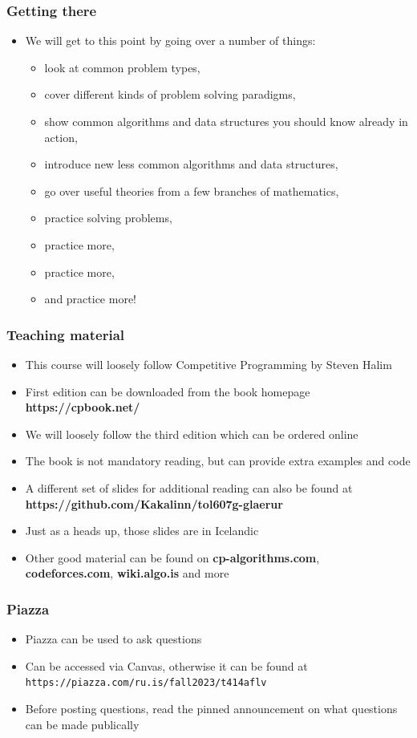 \documentclass{beamer}
\begin{document}
\begin{frame}[plain]
	\frametitle{Getting there}
	\begin{itemize}
		 \item We will get to this point by going over a number of things:
		 \begin{itemize}
		 	\item look at common problem types,
		 	\item cover different kinds of problem solving paradigms,
		 	\item show common algorithms and data structures you should know already in action,
		 	\item introduce new less common algorithms and data structures,
		 	\item go over useful theories from a few branches of mathematics,
		 	\item practice solving problems,
		 	\item practice more,
		 	\item practice more,
		 	\item and practice more!
		 \end{itemize}
	\end{itemize}
\end{frame}

\begin{frame}[plain]
	\frametitle{Teaching material}
	\begin{itemize}
		 \item This course will loosely follow \alert{Competitive Programming} by Steven Halim
		 \item First edition can be downloaded from the book homepage \textbf{https://cpbook.net/}
		 \item We will loosely follow the third edition which can be ordered online
		 \item The book is not mandatory reading, but can provide extra examples and code
		 \item A different set of slides for additional reading can also be found at \textbf{https://github.com/Kakalinn/tol607g-glaerur}
		 \item Just as a heads up, those slides are in Icelandic
         \item Other good material can be found on \textbf{cp-algorithms.com}, \textbf{codeforces.com}, \textbf{wiki.algo.is} and more
     \end{itemize}
\end{frame}

\begin{frame}[plain]
	\frametitle{Piazza}
	\begin{itemize}
		\item Piazza can be used to ask questions
        \item Can be accessed via Canvas, otherwise it can be found at \texttt{https://piazza.com/ru.is/fall2023/t414aflv}
        \item Before posting questions, read the pinned announcement on what questions can be made publically
	\end{itemize}
\end{frame}
\end{document}
